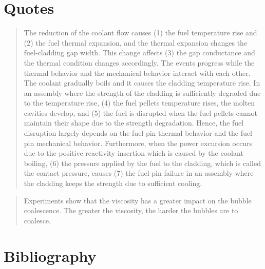 \documentclass[11pt]{article}
\begin{document}
\section{Quotes}
\label{sec:org58a1fa5}
\begin{quote}
The reduction of the coolant flow causes (1) the fuel temperature rise and (2) the fuel thermal expansion, and the thermal expansion changes the fuel-cladding gap width. This change affects (3) the gap conductance and the thermal condition changes accordingly. The events progress while the thermal behavior and the mechanical behavior interact with each other. The coolant gradually boils and it causes the cladding temperature rise. In an assembly where the strength of the cladding is sufficiently degraded due to the temperature rise, (4) the fuel pellets temperature rises, the molten cavities develop, and (5) the fuel is disrupted when the fuel pellets cannot maintain their shape due to the strength degradation. Hence, the fuel disruption largely depends on the fuel pin thermal behavior and the fuel pin mechanical behavior. Furthermore, when the power excursion occurs due to the positive reactivity insertion which is caused by the coolant boiling, (6) the pressure applied by the fuel to the cladding, which is called the contact pressure, causes (7) the fuel pin failure in an assembly where the cladding keeps the strength due to sufficient cooling.
\end{quote}
\begin{quote}
Experiments show that the viscosity has a greater impact on the bubble coalescence. The greater the viscosity, the harder the bubbles are to coalesce.
\end{quote}
\section{Bibliography}
\label{sec:orga6b097a}
\printbibliography[heading=none]
\end{document}
